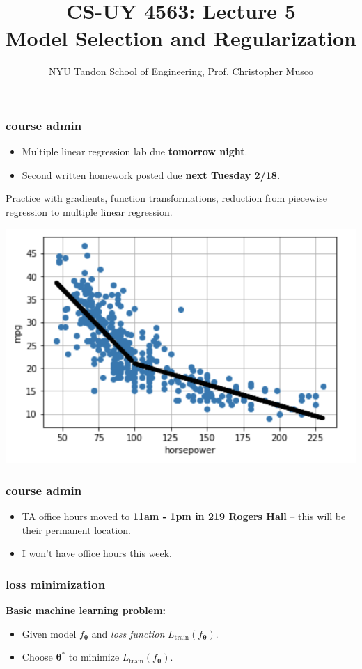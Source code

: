 \documentclass[handout,compress]{beamer}
\title{CS-UY 4563: Lecture 5 \\ Model Selection and Regularization}
\author{NYU Tandon School of Engineering, Prof. Christopher Musco}
\date{}
\newcommand{\bs}[1]{\boldsymbol{#1}}
\begin{document}
\begin{frame}
	\titlepage 
\end{frame}

\begin{frame}
	\frametitle{course admin}
	\begin{itemize}
		\item Multiple linear regression lab due \textbf{tomorrow night}. 
		\item Second written homework posted due \textbf{next Tuesday 2/18.} 
	\end{itemize}

Practice with gradients, function transformations, reduction from piecewise regression to multiple linear regression.
\begin{center}
	\includegraphics[width=.5\textwidth]{piecewise_fit.png}
\end{center}
\end{frame}

\begin{frame}
	\frametitle{course admin}
	\begin{itemize}
		\item TA office hours moved to \textbf{11am - 1pm in 219 Rogers Hall} -- this will be their permanent location. 
		\item I won't have office hours this week. 
	\end{itemize}
\end{frame}





\begin{frame}
	\frametitle{loss minimization}
	\textbf{Basic machine learning problem:}
	\begin{itemize}
		\item Given model $f_{\bs{\theta}}$ and \emph{loss function} $L_{\text{train}}(f_{\bs{\theta}})$. 
		\item Choose $\bs{\theta}^*$ to minimize $L_{\text{train}}(f_{\bs{\theta}})$. 
	\end{itemize}
\end{frame}
\end{document}
